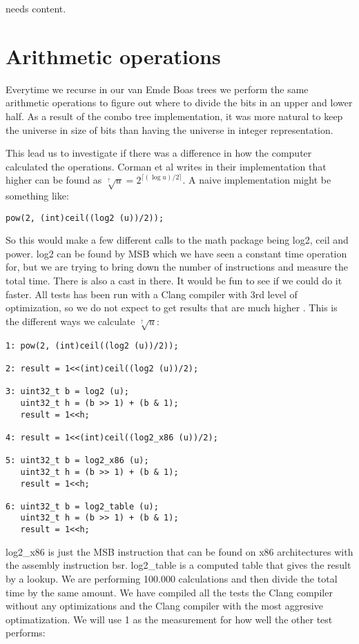 \documentclass[oneside,11pt,openright]{report}
\newcommand{\HIGHER}{\sqrt[\uparrow]{u}}
\begin{document}
needs content.

\chapter{Arithmetic operations}

Everytime we recurse in our van Emde Boas trees we perform the same arithmetic operations to figure out where to divide the bits in an upper and lower half. As a result of the combo tree implementation, it was more natural to keep the universe in size of bits than having the universe in integer representation. 

This lead us to investigate if there was a difference in how the computer calculated the operations. Corman et al writes in their implementation that higher can be found as $\HIGHER = 2^{\lceil{(\log u)/2}\rceil}$. A naive implementation might be something like:
\begin{lstlisting}
pow(2, (int)ceil((log2 (u))/2));
\end{lstlisting}

So this would make a few different calls to the math package being log2, ceil and power. log2 can be found by MSB which we have seen a constant time operation for, but we are trying to bring down the number of instructions and measure the total time. There is also a cast in there. It would be fun to see if we could do it faster. All tests has been run with a Clang compiler with 3rd level of optimization, so we do not expect to get results that are much higher . This is the different ways we calculate $\HIGHER$:

\begin{lstlisting}
1: pow(2, (int)ceil((log2 (u))/2));

2: result = 1<<(int)ceil((log2 (u))/2);

3: uint32_t b = log2 (u);
   uint32_t h = (b >> 1) + (b & 1);
   result = 1<<h;

4: result = 1<<(int)ceil((log2_x86 (u))/2);

5: uint32_t b = log2_x86 (u);
   uint32_t h = (b >> 1) + (b & 1);
   result = 1<<h;

6: uint32_t b = log2_table (u);
   uint32_t h = (b >> 1) + (b & 1);
   result = 1<<h;

\end{lstlisting}

log2\_x86 is just the MSB instruction that can be found on x86 architectures with the assembly instruction bsr. log2\_table is a computed table that gives the result by a lookup. We are performing 100.000 calculations and then divide the total time by the same amount. We have compiled all the tests the Clang compiler without any optimizations and the Clang compiler with the most aggresive optimatization. We will use 1 as the measurement for how well the other test performs:
\end{document}
